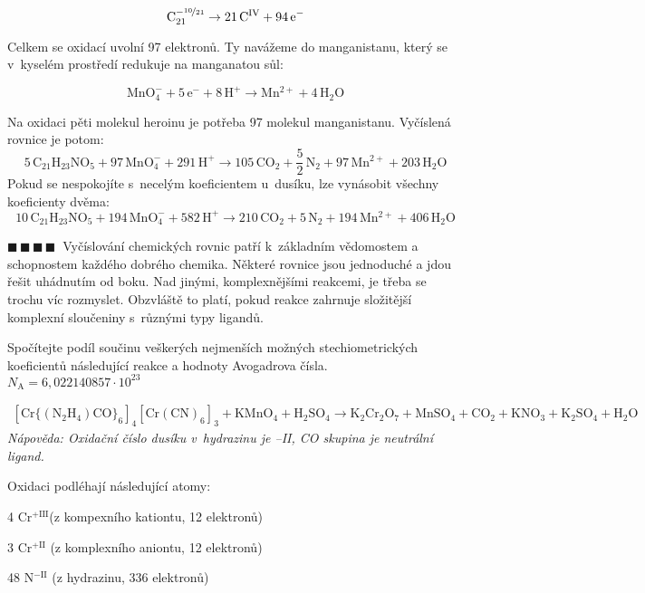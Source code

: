 \documentclass{book}
\newcommand{\ctyri}{$\blacksquare \, \blacksquare \, \blacksquare \, \blacksquare \; \; $}
\renewenvironment{quotation}{\par}{\par} %
\begin{document}
\[
\mathrm{C_{21}^{-\nicefrac{10}{21}}\rightarrow21\,C^{IV}+94\,e^{-}}
\]

Celkem se oxidací uvolní 97 elektronů. Ty navážeme do manganistanu,
který se v~kyselém prostředí redukuje na manganatou sůl:

\[
\mathrm{MnO_{4}^{-}+5\,e^{-}+8\,H^{+}\rightarrow Mn^{2+}+4\,H_{2}O}
\]

Na oxidaci pěti molekul heroinu je potřeba 97 molekul manganistanu.
Vyčíslená rovnice je potom:
\[
\mathrm{5\,C_{21}H_{23}NO_{5}+97\,MnO_{4}^{-}+291\,H^{+}\rightarrow105\,CO_{2}+\frac{5}{2}\,N_{2}+97\,Mn^{2+}+203\,H_{2}O}
\]
Pokud se nespokojíte s~necelým koeficientem u~dusíku, lze vynásobit všechny
koeficienty dvěma:
\[
\mathrm{10\,C_{21}H_{23}NO_{5}+194\,MnO_{4}^{-}+582\,H^{+}\rightarrow210\,CO_{2}+5\,N_{2}+194\,Mn^{2+}+406\,H_{2}O}
\]

\hrulefill
\begin{quotation}
\ctyri Vyčíslování chemických rovnic patří k~základním vědomostem a schopnostem
každého dobrého chemika. Některé rovnice jsou jednoduché a jdou řešit
uhádnutím od boku. Nad jinými, komplexnějšími reakcemi, je třeba se trochu víc rozmyslet. Obzvláště to platí, pokud reakce zahrnuje složitější komplexní sloučeniny s~různými typy ligandů.

Spočítejte podíl součinu veškerých nejmenších možných stechiometrických
koeficientů následující reakce a hodnoty Avogadrova čísla. $N_{\mathrm{A}}=6,022140857\cdot10^{23}$

\begin{align*}
\mathrm{[Cr\{(N_{2}H_{4})CO\}_{6}]_{4}[Cr(CN)_{6}]_{3}+KMnO_{4}+H_{2}SO_{4}} \rightarrow\mathrm{K_{2}Cr_{2}O_{7}+MnSO_{4}+CO_{2}+KNO_{3}+K_{2}SO_{4}+H_{2}O}
\end{align*}
\textit{Nápověda: Oxidační číslo dusíku v~hydrazinu je --II, CO skupina
je neutrální ligand.}
\end{quotation} \dotfill \par 

Oxidaci podléhají následující atomy:

 4 Cr$\mathrm{^{+III}}$(z kompexního kationtu, 12 elektronů)

 3 Cr$\mathrm{^{+II}}$ (z komplexního aniontu, 12 elektronů)

48 N$\mathrm{^{-II}}$ (z hydrazinu, 336 elektronů)
\end{document}
